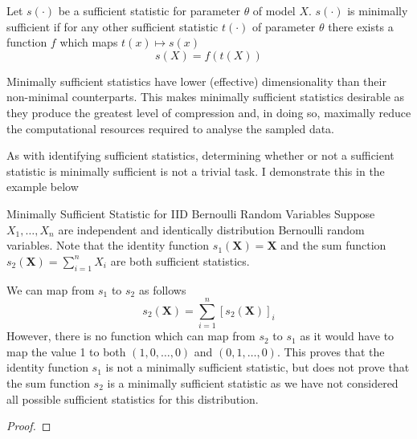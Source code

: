 \documentclass[11pt,a4paper,margin=0]{article}
\theoremstyle{break}
\begin{document}
  \begin{box_definition}\label{def_minimally_sufficient_statistic}
    Let $s(\cdot)$ be a sufficient statistic for parameter $\theta$ of model $X$. $s(\cdot)$ is minimally sufficient if for any other sufficient statistic $t(\cdot)$ of parameter $\theta$ there exists a function $f$ which maps $t(x)\mapsto s(x)$  \cite[]{dictionary_of_statistical_terms}
    \[ s(X)=f(t(X)) \]
  \end{box_definition}

  \par Minimally sufficient statistics have lower (effective) dimensionality than their non-minimal counterparts. This makes minimally sufficient statistics desirable as they produce the greatest level of compression and, in doing so, maximally reduce the computational resources required to analyse the sampled data.

  \par As with identifying sufficient statistics, determining whether or not a sufficient statistic is minimally sufficient is not a trivial task. I demonstrate this in the example below

  \begin{example}{Minimally Sufficient Statistic for IID Bernoulli Random Variables}
    Suppose $X_1,\dots,X_n$ are independent and identically distribution Bernoulli random variables. Note that the identity function $s_1(\mathbf{X})=\mathbf{X}$ and the sum function $s_2(\mathbf{X})=\sum_{i=1}^nX_i$ are both sufficient statistics.
    \par We can map from $s_1$ to $s_2$ as follows
    \[ s_2(\mathbf{X})=\sum_{i=1}^n [s_2(\mathbf{X})]_i \]
    However, there is no function which can map from $s_2$ to $s_1$ as it would have to map the value 1 to both $(1,0,\dots,0)$ and $(0,1,\dots,0)$. This proves that the identity function $s_1$ is not a minimally sufficient statistic, but does not prove that the sum function $s_2$ is a minimally sufficient statistic as we have not considered all possible sufficient statistics for this distribution.
  \end{example}

  \begin{box_theorem}
    \begin{proof}

    \end{proof}
  \end{box_theorem}
\end{document}

